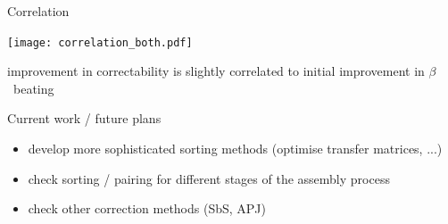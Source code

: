 \documentclass[usenames,dvipsnames,aspectratio=169,table]{beamer}
\begin{document}
\begin{frame} %
    {Correlation}

    \begin{minipage}{0.6\linewidth}
        \texttt{[image: correlation\_both.pdf]} 
    \end{minipage}
    \begin{minipage}{0.39\linewidth}
        improvement in correctability is slightly correlated to initial improvement in $\beta$~beating 
    \end{minipage}
    
\end{frame} %


\begin{frame} %
    {Current work / future plans}


    \begin{itemize}
        \item develop more sophisticated sorting methods (optimise transfer matrices, ...)
        \item check sorting / pairing for different stages of the assembly process
        \item check other correction methods (SbS, APJ)
    \end{itemize}
    
\end{frame} %

\end{document}
